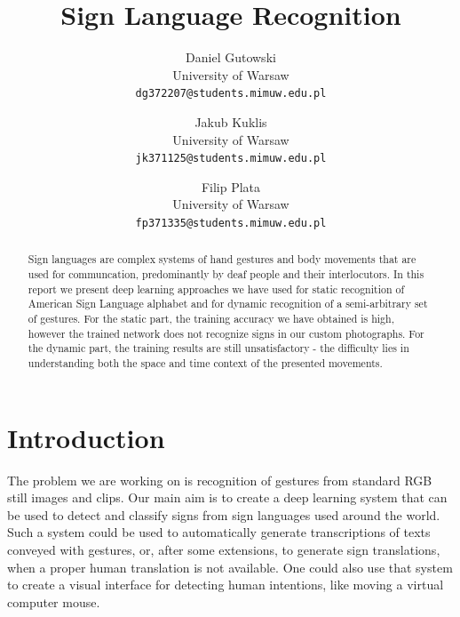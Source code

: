 \documentclass[10pt,twocolumn,letterpaper]{article}
\begin{document}
\title{Sign Language Recognition}

\author{Daniel Gutowski\\
University of Warsaw\\
{\tt\small dg372207@students.mimuw.edu.pl}
\and
Jakub Kuklis\\
University of Warsaw\\
{\tt\small jk371125@students.mimuw.edu.pl}
\and
Filip Plata\\
University of Warsaw\\
{\tt\small fp371335@students.mimuw.edu.pl}
}

\maketitle

\begin{abstract}
	Sign languages are complex systems of hand gestures and body movements that are used for communcation, predominantly by deaf people and their interlocutors.
	In this report we present deep learning approaches we have used for static recognition of American Sign Language alphabet
	and for dynamic recognition of a semi-arbitrary set of gestures. For the static part, the training accuracy we have obtained is high,
	however the trained network does not recognize signs in our custom photographs. For the dynamic part, the training results are still unsatisfactory
	- the difficulty lies in understanding both the space and time context of the presented movements. 
\end{abstract}

\section{Introduction}

The problem we are working on is recognition of gestures from standard RGB still images and clips.
Our main aim is to create a deep learning system that can be used to detect and classify signs from sign languages used around the world.
Such a system could be used to automatically generate transcriptions of texts conveyed with gestures,
or, after some extensions, to generate sign translations, when a proper human translation is not available.
One could also use that system to create a visual interface for detecting human intentions, like moving a virtual computer mouse.
\end{document}
